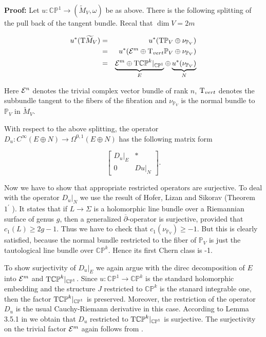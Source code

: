 \documentclass[a4paper,14pt]{article}
\newcommand{\B}[1]{\mathbb #1}
\newcommand{\C}[1]{{\cal #1}}
\newcommand{\p}{{\partial}}
\newcommand{\Om}{{\Omega}}
\newcommand{\om}{{\omega}}
\newcommand{\Si}{{\Sigma}}
\newcommand{\blowMV}{\widetilde {M}_V}
\newcommand{\cp}{{\B C\B P}}
\newcommand{\T }{\hbox {\text {T}}}
\newcommand{\pf}{\NI {\bf Proof: }}
\newcommand{\BS}{{\bigskip}}
\newcommand{\NI}{{\noindent}}
\numberwithin{equation}{section}
\begin{document}
\pf
Let $u:\cp ^1\to (\blowMV,\om )$ be as above.
There is the following splitting of the pull back
of the tangent bundle. Recal that $\dim V = 2m$


\begin{eqnarray*}
u^*(\T\blowMV )&=& u^*(\T\B P_V \oplus \nu _{\B P_V})\\
&=& u^*( \C E ^{m} \oplus \T_{vert}\B P_V \oplus \nu _{\B P_V})\\
&=&\underbrace {\C E^{m} \oplus \T\cp ^k|_{\cp ^1}}_E\oplus
\underbrace{  u^*(\nu _{\B P_V})}_N
\end{eqnarray*}

\NI
Here $\C E^n$ denotes the trivial complex vector bundle of
rank $n$, $\T_{vert}$ denotes the subbundle tangent
to the fibers of the fibration and $\nu _{\B P_V}$
is the normal bundle to $\B P_V$ in $\blowMV $.

With respect to the above splitting, the operator
$D_u:C^{\infty }(E\oplus N)\to \Om ^{0,1}(E\oplus N)$
has the following matrix form

$$
\left [
\begin{array}{cc}
D_u|_E & *    \\
0      & Du|_N
\end{array}
\right ].
$$
\BS

\NI
Now we have to show that appropriate restricted operators
are surjective.
To deal with the operator $D_u|_N$ we use the
result of Hofer, Lizan and Sikorav \cite{hls} (Theorem $1^{\prime}$ ).
It states that if $L \to \Si $ is a holomorphic line bundle
over a Riemannian surface of genus $g$, then a generalized
$\overline \p $-operator is surjective, provided that
$c_1(L) \geq 2g -1$. Thus we have to check that
$c_1(\nu _{\B P_V}) \geq -1$. But this is clearly satisfied,
because the normal bundle restricted to the fiber of
$\B P_V$ is just the tautological line bundle
over $\cp ^k$. Hence its first Chern class is -1.

To show surjectivity of $D_u|_E$ we again argue with
the direc decomposition of $E$ into $\C E^m$ and
$\T \cp^k|_{\cp ^1}$.
Since $u:\cp ^1 \to \cp ^k$ is the standard
holomorphic embedding and the structure $J$ restricted to
$\cp ^k$ is the stanard integrable one,
then the factor $\T \cp^k|_{\cp ^1}$ is preserved.
Moreover, the restriction of
the operator $D_u$ is the usual Cauchy-Riemann
derivative in this case. According to Lemma 3.5.1 in \cite{ms2} we obtain
that $D_u$ restricted to $\T \cp^k|_{\cp ^1}$ is surjective.
The surjectivity on the trivial factor $\C E^m$ again follows
from \cite{hls}.
\end{document}
